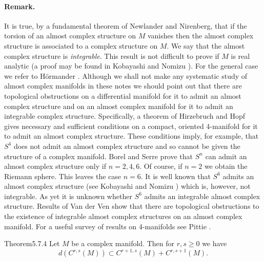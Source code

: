 \paragraph{Remark.} It is true, by a fundamental theorem of Newlander and Nirenberg, that if the torsion of an almost complex structure on $M$ vanishes then the almost complex structure is associated to a complex structure on $M$. We say that the almost complex structure is \emph{integrable}. This result is not difficult to prove if $M$ is real analytic (a proof may be found in Kobayashi and Nomizu \cite[Appendix 8]{bib:II:kobayashi-s-and-nomizu-k:2}). For the general case we refer to H\"ormander \cite{bib:II:hormander-l:1}. Although we shall not make any systematic study of almost complex manifolds in these notes we should point out that there are topological obstructions on a differential manifold for it to admit an almost complex structure and on an almost complex manifold for it to admit an integrable complex structure. Specifically, a theorem of Hirzebruch and Hopf \cite{bib:II:hirzebruch-f-and-hopf-h:1} gives necessary and sufficient conditions on a compact, oriented 4-manifold for it to admit an almost complex structure. These conditions imply, for example, that $S^4$ does not admit an almost complex structure and so cannot be given the structure of a complex manifold. Borel and Serre \cite{bib:II:borel-a-and-serre-j-p:1} prove that $S^n$ can admit an almost complex structure only if $n=2,4,6$. Of course, if $n=2$ we obtain the Riemann sphere. This leaves the case $n=6$. It is well known that $S^6$ admits an almost complex structure (see Kobayashi and Nomizu \cite[page 139]{bib:II:kobayashi-s-and-nomizu-k:2}) which is, however, not integrable. As yet it is unknown whether $S^6$ admits an integrable almost complex structure. Results of Van der Ven \cite{bib:II:van-der-ven-a:1} show that there are topological obstructions to the existence of integrable almost complex structures on an almost complex manifold. For a useful survey of results on 4-manifolds see Pittie \cite{bib:II:pittie-h:1}.
\begin{originaltheorem}{Theorem}{5.7.4}
Let $M$ be a complex manifold. Then for $r,s\geq0$ we have
\[d(C^{r,s}(M))\subset C^{r+1,s}(M)+C^{r,s+1}(M).\]
\end{originaltheorem}
